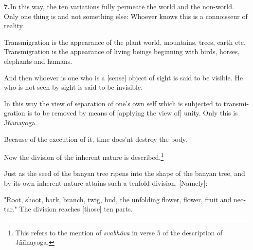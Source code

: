 \begin{otherlanguage}{english}
\begin{tlate}
   \end{tlate}
  \begin{tlate}
    \textbf{7.}In this way, the ten variations fully permeate the world and the non-world.
     Only one thing is and not something else: Whoever knows this is a connoisseur of reality. \\
  \end{tlate}
 \begin{tlate}
   Transmigration is the appearance of the plant world, mountains, trees, earth etc. Transmigration is the appearance of living beings beginning with birds, horses, elephants and humans.
 \end{tlate}
  \begin{tlate}
    And then whoever is one who is a [sense] object of sight is said to be visible. He who is not seen by sight is said to be invisible.
  \end{tlate}
\begin{tlate}
In this way the view of separation of one's own self which is subjected to transmigration is to be removed by means of [applying the view of] unity. Only this is Jñānayoga.  
\end{tlate}
\begin{tlate}
\noindent Because of the execution of it, time does'nt destroy the body. \\
\end{tlate}
\begin{tlate}    
Now the division of the inherent nature is described.\footnote{This refers to the mention of \textit{svabhāva} in verse 5 of the description of Jñānayoga.}
\end{tlate}
\begin{tlate}
\noindent Just as the seed of the banyan tree ripens into the shape of the banyan tree, and by its own inherent nature attains such a tenfold division. [Namely]:
\end{tlate}
\begin{tlate}
\noindent "Root, shoot, bark, branch, twig, bud, the unfolding flower, flower, fruit and nectar." The division reaches [those] ten parts.
\end{tlate}
\begin{tlate}

\end{tlate}
\end{otherlanguage}
